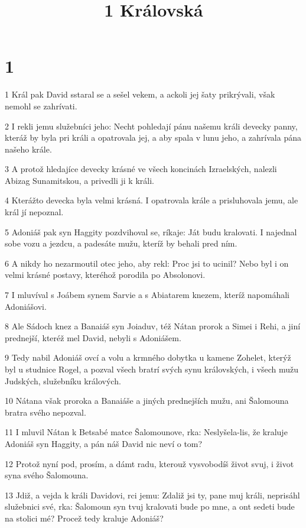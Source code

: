 

\title{1 Královská}

\chapter{1}

\par 1 Král pak David sstaral se a sešel vekem, a ackoli jej šaty prikrývali, však nemohl se zahrívati.
\par 2 I rekli jemu služebníci jeho: Necht pohledají pánu našemu králi devecky panny, kteráž by byla pri králi a opatrovala jej, a aby spala v lunu jeho, a zahrívala pána našeho krále.
\par 3 A protož hledajíce devecky krásné ve všech koncinách Izraelských, nalezli Abizag Sunamitskou, a privedli ji k králi.
\par 4 Kterážto devecka byla velmi krásná. I opatrovala krále a prisluhovala jemu, ale král jí nepoznal.
\par 5 Adoniáš pak syn Haggity pozdvihoval se, ríkaje: Ját budu kralovati. I najednal sobe vozu a jezdcu, a padesáte mužu, kteríž by behali pred ním.
\par 6 A nikdy ho nezarmoutil otec jeho, aby rekl: Proc jsi to ucinil? Nebo byl i on velmi krásné postavy, kteréhož porodila po Absolonovi.
\par 7 I mluvíval s Joábem synem Sarvie a s Abiatarem knezem, kteríž napomáhali Adoniášovi.
\par 8 Ale Sádoch knez a Banaiáš syn Joiaduv, též Nátan prorok a Simei i Rehi, a jiní prednejší, kteréž mel David, nebyli s Adoniášem.
\par 9 Tedy nabil Adoniáš ovcí a volu a krmného dobytka u kamene Zohelet, kterýž byl u studnice Rogel, a pozval všech bratrí svých synu královských, i všech mužu Judských, služebníku králových.
\par 10 Nátana však proroka a Banaiáše a jiných prednejších mužu, ani Šalomouna bratra svého nepozval.
\par 11 I mluvil Nátan k Betsabé matce Šalomounove, rka: Neslyšela-lis, že kraluje Adoniáš syn Haggity, a pán náš David nic neví o tom?
\par 12 Protož nyní pod, prosím, a dámt radu, kterouž vysvobodíš život svuj, i život syna svého Šalomouna.
\par 13 Jdiž, a vejda k králi Davidovi, rci jemu: Zdaliž jsi ty, pane muj králi, neprisáhl služebnici své, rka: Šalomoun syn tvuj kralovati bude po mne, a ont sedeti bude na stolici mé? Procež tedy kraluje Adoniáš?
